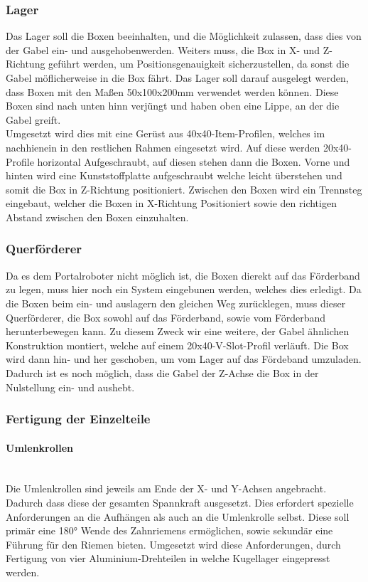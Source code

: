 \subsubsection{Lager}
Das Lager soll die Boxen beeinhalten, und die Möglichkeit zulassen, dass dies von der Gabel ein- und ausgehobenwerden. Weiters muss, die Box in X- und Z-Richtung geführt werden, um Positionsgenauigkeit sicherzustellen, da sonst die Gabel möflicherweise in die Box fährt. Das Lager soll darauf ausgelegt werden, dass Boxen mit den Maßen 50x100x200mm verwendet werden können. Diese Boxen sind nach unten hinn verjüngt und haben oben eine Lippe, an der die Gabel greift.\\
Umgesetzt wird dies mit eine Gerüst aus 40x40-Item-Profilen, welches im nachhienein in den restlichen Rahmen eingesetzt wird. Auf diese werden 20x40-Profile horizontal Aufgeschraubt, auf diesen stehen dann die Boxen. Vorne und hinten wird eine Kunststoffplatte aufgeschraubt welche leicht überstehen und somit die Box in Z-Richtung positioniert. Zwischen den Boxen wird ein Trennsteg eingebaut, welcher die Boxen in X-Richtung Positioniert sowie den richtigen Abstand zwischen den Boxen einzuhalten.

\subsubsection{Querförderer}
Da es dem Portalroboter nicht möglich ist, die Boxen dierekt auf das Förderband zu legen, muss hier noch ein System eingebunen werden, welches dies erledigt. Da die Boxen beim ein- und auslagern den gleichen Weg zurücklegen, muss dieser Querförderer, die Box sowohl auf das Förderband, sowie vom Förderband herunterbewegen kann. 
Zu diesem Zweck wir eine weitere, der Gabel ähnlichen Konstruktion montiert, welche auf einem 20x40-V-Slot-Profil verläuft. Die Box wird dann hin- und her geschoben, um vom Lager auf das Fördeband umzuladen. Dadurch ist es noch möglich, dass die Gabel der Z-Achse die Box in der Nulstellung ein- und aushebt.


\subsubsection{Fertigung der Einzelteile}


\paragraph{Umlenkrollen}\mbox{}\\
Die Umlenkrollen sind jeweils am Ende der X- und Y-Achsen angebracht. Dadurch dass diese der gesamten Spannkraft ausgesetzt. Dies erfordert spezielle Anforderungen an die Aufhängen als auch an die Umlenkrolle selbst. Diese soll primär eine 180° Wende des Zahnriemens ermöglichen, sowie sekundär eine Führung für den Riemen bieten. 
Umgesetzt wird diese Anforderungen, durch Fertigung von vier Aluminium-Drehteilen in welche Kugellager eingepresst werden.

